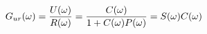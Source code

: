 \documentclass[preview]{standalone}
\begin{document}
\begin{align*}
\special{dvisvgm:raw <g id='unique000'>}G_{ur}(\omega)=\frac{U(\omega)}{R(\omega)}=\frac{C(\omega)}{1+C(\omega)P(\omega)}=S(\omega)C(\omega)\special{dvisvgm:raw </g>}
\end{align*}
\end{document}
